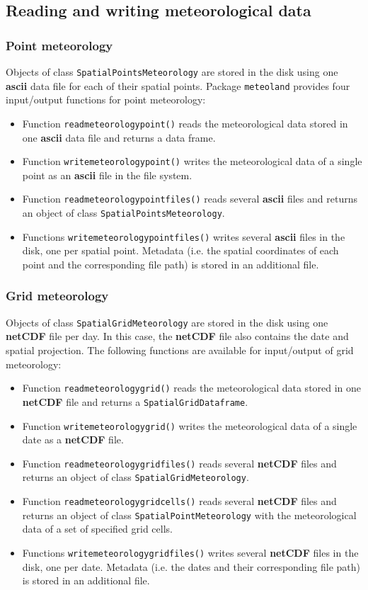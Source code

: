 \documentclass[11pt,a4paper]{article}
\begin{document}
\subsection{Reading and writing meteorological data}
\subsubsection{Point meteorology}
Objects of class \texttt{SpatialPointsMeteorology} are stored in the disk using one \textbf{ascii} data file for each of their spatial points. Package \texttt{meteoland} provides four input/output functions for point meteorology:
\begin{itemize}
\item{Function \texttt{readmeteorologypoint()} reads the meteorological data stored in one \textbf{ascii} data file and returns a data frame.}
\item{Function \texttt{writemeteorologypoint()} writes the meteorological data of a single point as an \textbf{ascii} file in the file system.}
\item{Function \texttt{readmeteorologypointfiles()} reads several \textbf{ascii} files and returns an object of class \texttt{SpatialPointsMeteorology}.}
\item{Functions \texttt{writemeteorologypointfiles()} writes several \textbf{ascii} files in the disk, one per spatial point. Metadata (i.e. the spatial coordinates of each point and the corresponding file path) is stored in an additional file.}
\end{itemize}

\subsubsection{Grid meteorology}
 Objects of class \texttt{SpatialGridMeteorology} are stored in the disk using one \textbf{netCDF} file per day. In this case, the \textbf{netCDF} file also contains the date and spatial projection. The following functions are available for input/output of grid meteorology:
\begin{itemize}
\item{Function \texttt{readmeteorologygrid()} reads the meteorological data stored in one \textbf{netCDF} file and returns a \texttt{SpatialGridDataframe}.}
\item{Function \texttt{writemeteorologygrid()} writes the meteorological data of a single date as a \textbf{netCDF} file.}
\item{Function \texttt{readmeteorologygridfiles()} reads several \textbf{netCDF} files and returns an object of class \texttt{SpatialGridMeteorology}.}
\item{Function \texttt{readmeteorologygridcells()} reads several \textbf{netCDF} files and returns an object of class \texttt{SpatialPointMeteorology} with the meteorological data of a set of specified grid cells.}
\item{Functions \texttt{writemeteorologygridfiles()} writes several \textbf{netCDF} files in the disk, one per date. Metadata (i.e. the dates and their corresponding file path) is stored in an additional file.}
\end{itemize}
\end{document}
